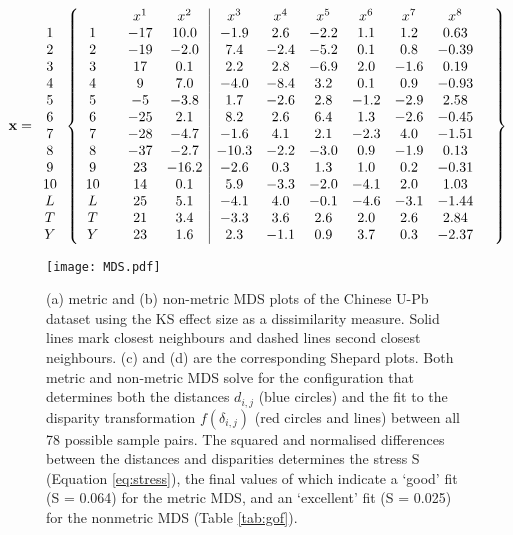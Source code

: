 \documentclass[authoryear,preprint,review,12pt]{elsarticle}
\begin{document}
\begin{equation}
{\bf x} = 
\begin{array}{c}
~ \\
1 \\
2 \\
3 \\
4 \\
5 \\
6 \\
7 \\
8 \\
9 \\
10 \\
L \\
T \\
Y 
\end{array}
\left\{
\begin{array}{cccc|cccccccc}
 && x^1 & x^2 & x^3 & x^4 & x^5 & x^6 & x^7 & x^8 & \\
1 && -17 & 10.0 & -1.9 & 2.6 & -2.2 & 1.1 & 1.2 & 0.63 & \\
2 && -19 & -2.0 & 7.4 & -2.4 & -5.2 & 0.1 & 0.8 & -0.39 \\
3 && 17 & 0.1 & 2.2 & 2.8 & -6.9 & 2.0 & -1.6 & 0.19 \\
4 && 9 & 7.0 & -4.0 & -8.4 & 3.2 & 0.1 & 0.9 & -0.93 \\
5 && -5 & -3.8 & 1.7 & -2.6 & 2.8 & -1.2 & -2.9 & 2.58 \\
6 && -25 & 2.1 & 8.2 & 2.6 & 6.4 & 1.3 & -2.6 & -0.45 \\
7 && -28 & -4.7 & -1.6 & 4.1 & 2.1 & -2.3 & 4.0 & -1.51 \\
8 && -37 & -2.7 & -10.3 & -2.2 & -3.0 & 0.9 & -1.9 & 0.13 \\
9 && 23 & -16.2 & -2.6 & 0.3 & 1.3 & 1.0 & 0.2 & -0.31 \\
10 && 14 & 0.1 & 5.9 & -3.3 & -2.0 & -4.1 & 2.0 & 1.03 \\
L && 25 & 5.1 & -4.1 & 4.0 & -0.1 & -4.6 & -3.1 & -1.44 \\
T && 21 & 3.4 & -3.3 & 3.6 & 2.6 & 2.0 & 2.6 & 2.84 \\
Y && 23 & 1.6 & 2.3 & -1.1 & 0.9 & 3.7 & 0.3 & -2.37
\end{array}
\right\}
\label{eq:xmuus}
\end{equation}

\begin{figure}
\texttt{[image: MDS.pdf]}
\caption{(a) metric and (b) non-metric MDS plots of the Chinese U-Pb
  dataset using the KS effect size as a dissimilarity measure. Solid
  lines mark closest neighbours and dashed lines second closest
  neighbours.  (c) and (d) are the corresponding Shepard plots.  Both
  metric and non-metric MDS solve for the configuration that
  determines both the distances $d_{i,j}$ (blue circles) and the fit
  to the disparity transformation $f(\delta_{i,j})$ (red circles and
  lines) between all 78 possible sample pairs.  The squared and
  normalised differences between the distances and disparities
  determines the stress S (Equation \ref{eq:stress}), the final values
  of which indicate a `good' fit (S = 0.064) for the metric MDS, and
  an `excellent' fit (S = 0.025) for the nonmetric MDS (Table
  \ref{tab:gof}).}
\label{fig:MDS}
\end{figure}
\end{document}
